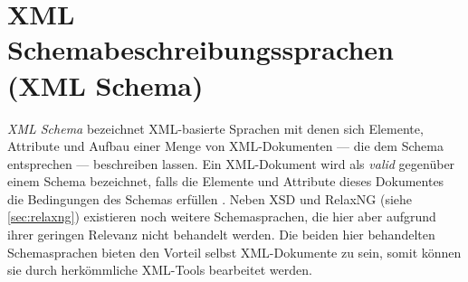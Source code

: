 \section{XML Schemabeschreibungssprachen (XML Schema)}
\label{sec:xmlschema}

\emph{XML Schema} bezeichnet XML-basierte Sprachen mit denen sich Elemente, Attribute und Aufbau einer Menge von XML-Dokumenten --- die dem Schema entsprechen --- beschreiben lassen. 
Ein XML-Dokument wird als \emph{valid} gegenüber einem Schema bezeichnet, falls die Elemente und Attribute dieses Dokumentes die Bedingungen des Schemas erfüllen \cite{taxonomyXMLSchema}.
Neben XSD und RelaxNG (siehe \cref{sec:relaxng}) existieren noch weitere Schemasprachen, die hier aber aufgrund ihrer geringen Relevanz nicht behandelt werden. Die beiden hier behandelten Schemasprachen bieten den Vorteil selbst XML-Dokumente zu sein, somit können sie durch herkömmliche XML-Tools bearbeitet werden.



%